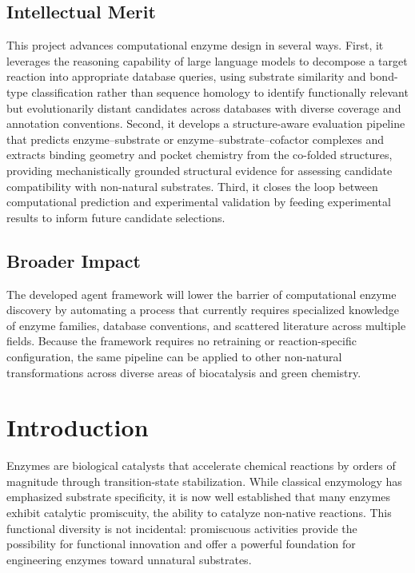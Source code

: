 \documentclass[12pt]{article}
\begin{document}
\subsection*{Intellectual Merit}
This project advances computational enzyme design in several ways. First, it leverages the reasoning capability of large language models to decompose a target reaction into appropriate database queries, using substrate similarity and bond-type classification rather than sequence homology to identify functionally relevant but evolutionarily distant candidates across databases with diverse coverage and annotation conventions. Second, it develops a structure-aware evaluation pipeline that predicts enzyme--substrate or enzyme--substrate--cofactor complexes and extracts binding geometry and pocket chemistry from the co-folded structures, providing mechanistically grounded structural evidence for assessing candidate compatibility with non-natural substrates. Third, it closes the loop between computational prediction and experimental validation by feeding experimental results to inform future candidate selections.

\subsection*{Broader Impact}
The developed agent framework will lower the barrier of computational enzyme discovery by automating a process that currently requires specialized knowledge of enzyme families, database conventions, and scattered literature across multiple fields. Because the framework requires no retraining or reaction-specific configuration, the same pipeline can be applied to other non-natural transformations across diverse areas of biocatalysis and green chemistry.
\newpage

\section{Introduction}
\label{sec:Introduction}

Enzymes are biological catalysts that accelerate chemical reactions by orders of magnitude through transition-state stabilization. While classical enzymology has emphasized substrate specificity, it is now well established that many enzymes exhibit catalytic promiscuity, the ability to catalyze non-native reactions\cite{khersonsky2010enzyme, copley2003enzymes}. This functional diversity is not incidental: promiscuous activities provide the possibility for functional innovation and offer a powerful foundation for engineering enzymes toward unnatural substrates\cite{hult2007enzyme}.
\end{document}
